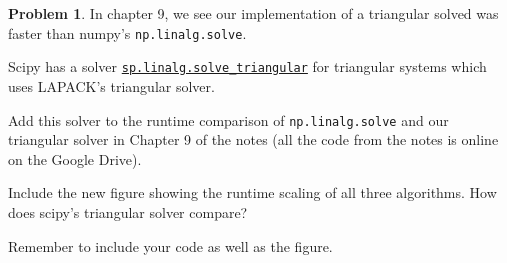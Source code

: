 \documentclass[12pt]{article}
\theoremstyle{definition}
\newtheorem{problem}{Problem}
\begin{document}
\begin{problem}

    In chapter 9, we see our implementation of a triangular solved was faster than numpy's \lstinline{np.linalg.solve}.

    Scipy has a solver \href{https://docs.scipy.org/doc/scipy/reference/generated/scipy.linalg.solve_triangular.html}{\lstinline{sp.linalg.solve_triangular}} for triangular systems which uses LAPACK's triangular solver.

    Add this solver to the runtime comparison of \lstinline{np.linalg.solve} and our triangular solver in Chapter 9 of the notes (all the code from the notes is online on the Google Drive).
    
    Include the new figure showing the runtime scaling of all three algorithms.
    How does scipy's triangular solver compare?

    Remember to include your code as well as the figure.

\end{problem}
\end{document}
